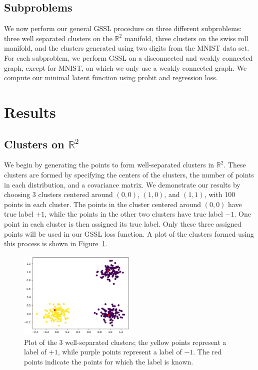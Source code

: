 \documentclass[12pt]{amsart}
\begin{document}
\subsection{Subproblems}

We now perform our general GSSL procedure on three different subproblems: three well separated clusters on the $\mathbb{R}^2$ manifold, three clusters on the swiss roll manifold, and the clusters generated using two digits from the MNIST data set. For each subproblem, we perform GSSL on a disconnected and weakly connected graph, except for MNIST, on which we only use a weakly connected graph. We compute our minimal latent function using probit and regression loss.

\section{Results}

\subsection{Clusters on $\mathbb{R}^2$}\label{Sec:3Clus}

We begin by generating the points to form well-separated clusters in $\mathbb{R}^2$. These clusters are formed by specifying the centers of the clusters, the number of points in each distribution, and a covariance matrix. We demonstrate our results by choosing 3 clusters centered around $(0,0)$, $(1,0)$, and $(1,1)$, with 100 points in each cluster.
The points in the cluster centered around $(0,0)$ have true label $+1$, while the points in the other two clusters have true label $-1$. One point in each cluster is then assigned its true label. Only these three assigned points will be used in our GSSL loss function. A plot of the clusters formed using this process is shown in Figure~\ref{Fig:Dis3ClusOg}.
\begin{figure}
    \centering
    \includegraphics[width=0.5\textwidth]{Figures/Dis3ClusOG.png}
    \caption{
        Plot of the 3 well-separated clusters; the yellow points represent a label of $+1$, while purple points represent a label of $-1$. The red points indicate the points for which the label is known. 
    }
	\label{Fig:Dis3ClusOg}
\end{figure}
\end{document}
